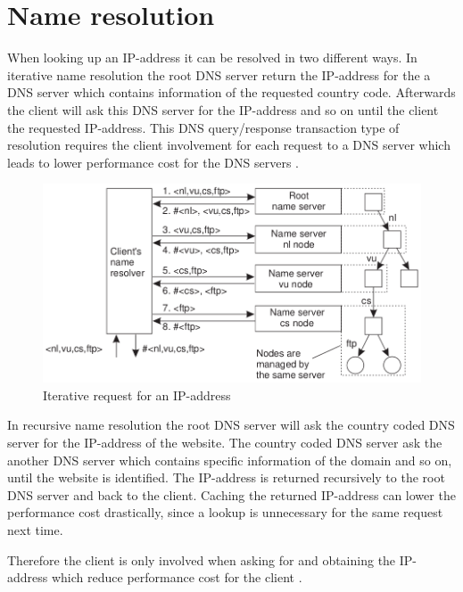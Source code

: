 \documentclass[a4paper,10pt]{report}
\begin{document}
\newpage
\section{Name resolution}\label{sec:nameRes}

When looking up an IP-address it can be resolved in two different ways.
In iterative name resolution the root DNS server return the IP-address for the a DNS server which contains information of the requested country code. 
Afterwards the client will ask this DNS server for the IP-address and so on until the client the requested IP-address.
This DNS query/response transaction type of resolution requires the client involvement for each request to a DNS server which leads to lower performance cost for the DNS servers \cite[p. 205-209]{Tanenbaum}.

\begin{figure}[H]
\centering
\includegraphics[scale=0.6]{iterativ}
\caption{Iterative request for an IP-address}
\label{fig:iterativ}
\end{figure}


In recursive name resolution the root DNS server will ask the country coded DNS server for the IP-address of the website.
The country coded DNS server ask the another DNS server which contains specific information of the domain and so on, until the website is identified.
The IP-address is returned recursively to the root DNS server and back to the client.
Caching the returned IP-address can lower the performance cost drastically, since a lookup is unnecessary for the same request next time.

Therefore the client is only involved when asking for and obtaining the IP-address which reduce performance cost for the client \cite[p. 205-209]{Tanenbaum}.
\end{document}
